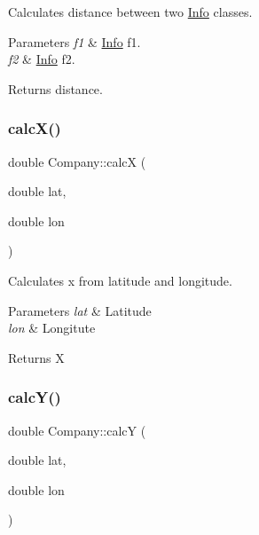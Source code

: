 Calculates distance between two \hyperlink{class_info}{Info} classes. 


\begin{DoxyParams}{Parameters}
{\em f1} & \hyperlink{class_info}{Info} f1. \\
\hline
{\em f2} & \hyperlink{class_info}{Info} f2. \\
\hline
\end{DoxyParams}
\begin{DoxyReturn}{Returns}
distance. 
\end{DoxyReturn}
\mbox{\label{class_company_abd0b1a606cefd9264ef3d88933298bcf}} 
\subsubsection{\texorpdfstring{calc\+X()}{calcX()}}
{\footnotesize\ttfamily double Company\+::calcX (\begin{DoxyParamCaption}\item[{double}]{lat,  }\item[{double}]{lon }\end{DoxyParamCaption})}



Calculates x from latitude and longitude. 


\begin{DoxyParams}{Parameters}
{\em lat} & Latitude \\
\hline
{\em lon} & Longitute \\
\hline
\end{DoxyParams}
\begin{DoxyReturn}{Returns}
X 
\end{DoxyReturn}
\mbox{\label{class_company_a304161b9fc41ffbfd4ee5b611bc0970d}} 
\subsubsection{\texorpdfstring{calc\+Y()}{calcY()}}
{\footnotesize\ttfamily double Company\+::calcY (\begin{DoxyParamCaption}\item[{double}]{lat,  }\item[{double}]{lon }\end{DoxyParamCaption})}



